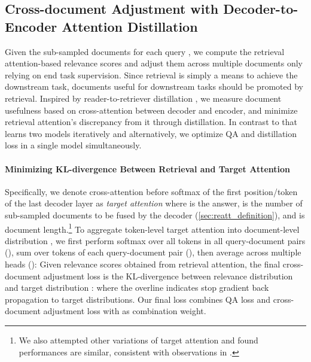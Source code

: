 \documentclass[11pt, dvipsnames]{article}
\newcommand{\adjust}{adjust\xspace}
\newcommand{\adjustloss}{cross-document adjustment loss\xspace}
\begin{document}
\subsection{Cross-document Adjustment with Decoder-to-Encoder Attention Distillation}\label{sec:learn_reatt_loss}
Given the sub-sampled  documents  for each query , we compute the retrieval attention-based relevance scores  and \adjust them across multiple documents  only relying on end task supervision.
Since retrieval is simply a means to achieve the downstream task, documents useful for downstream tasks should be promoted by retrieval.
Inspired by reader-to-retriever distillation \cite{fid-kd-2021-izacard,retread-2020-yang}, we measure document usefulness based on cross-attention between decoder and encoder, and minimize retrieval attention's discrepancy from it through distillation.
In contrast to \citet{fid-kd-2021-izacard} that learns two models iteratively and alternatively, we optimize QA and distillation loss in a single model simultaneously.

\paragraph{Minimizing KL-divergence Between Retrieval and Target Attention}
Specifically, we denote cross-attention before softmax of the first position/token of the last decoder layer as \emph{target attention}  where  is the answer,  is the number of sub-sampled documents to be fused by the decoder (\autoref{sec:reatt_definition}), and  is document length.\footnote{We also attempted other variations of target attention and found performances are similar, consistent with observations in \citet{fid-kd-2021-izacard}.}
To aggregate token-level target attention into document-level distribution , we first perform softmax over all tokens in all query-document pairs (), sum over tokens of each query-document pair (), then average across multiple heads ():
\begingroup\makeatletter\def\f@size{10}\check@mathfonts
\def\maketag@@@#1{\hbox{\m@th\large\normalfont#1}}
\endgroup
Given relevance scores obtained from retrieval attention, the final \adjustloss is the KL-divergence between relevance distribution  and target distribution :
\begingroup\makeatletter\def\f@size{9}\check@mathfonts
\def\maketag@@@#1{\hbox{\m@th\large\normalfont#1}}
\endgroup
where the overline indicates stop gradient back propagation to target distributions.
Our final loss combines QA loss and \adjustloss with  as combination weight.
\end{document}
